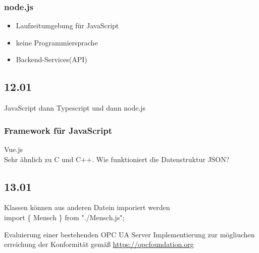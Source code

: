 \subsubsection*{node.js}
\begin{itemize}
    \item Laufzeitumgebung für JavaScript
    \item keine Programmiersprache
    \item Backend-Services(API)
\end{itemize}

\subsection{12.01}
JavaScript dann Typescript und dann node.js 
\subsubsection*{Framework für JavaScript}
Vue.js \\
Sehr ähnlich zu C und C++. Wie funktioniert die Datenstruktur JSON? 


\subsection{13.01}
Klassen können aus anderen Datein imporiert werden\\ import \{ Mensch \} from "./Mensch.js";

Evaluierung einer bestehenden OPC UA Server Implementierung zur mögliuchen erreichung der Konformität gemäß \href{https://opcfoundation.org/developer-tools/certification-test-tools/opc-ua-compliance-test-tool-uactt/}{https://opcfoundation.org}
